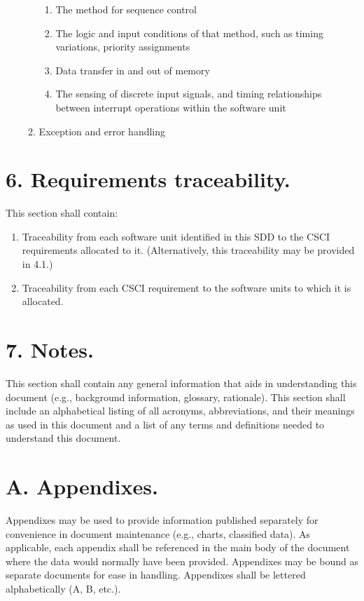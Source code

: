 \begin{enumerate}
\begin{enumerate}
    \begin{enumerate}
    \itemsep1pt\parskip0pt
    \item
      The method for sequence control
    \item
      The logic and input conditions of that method, such as timing
      variations, priority assignments
    \item
      Data transfer in and out of memory
    \item
      The sensing of discrete input signals, and timing relationships
      between interrupt operations within the software unit
    \end{enumerate}
  \item
    Exception and error handling
  \end{enumerate}
\end{enumerate}

\section{6. Requirements traceability.}

This section shall contain:

\begin{enumerate}
\itemsep1pt\parskip0pt
\item
  Traceability from each software unit identified in this SDD to the
  CSCI requirements allocated to it. (Alternatively, this traceability
  may be provided in 4.1.)
\item
  Traceability from each CSCI requirement to the software units to which
  it is allocated.
\end{enumerate}

\section{7. Notes.}

This section shall contain any general information that aids in
understanding this document (e.g., background information, glossary,
rationale). This section shall include an alphabetical listing of all
acronyms, abbreviations, and their meanings as used in this document and
a list of any terms and definitions needed to understand this document.

\section{A. Appendixes.}

Appendixes may be used to provide information published separately for
convenience in document maintenance (e.g., charts, classified data). As
applicable, each appendix shall be referenced in the main body of the
document where the data would normally have been provided. Appendixes
may be bound as separate documents for ease in handling. Appendixes
shall be lettered alphabetically (A, B, etc.).

